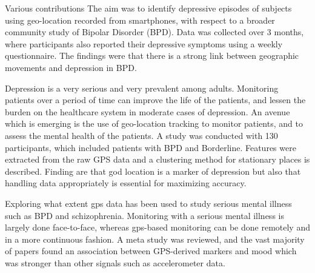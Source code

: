 Various contributions The aim was to identify depressive episodes of subjects using geo-location recorded from smartphones, with respect to a broader community study of Bipolar Disorder (BPD). Data was collected over 3 months, where participants also reported their depressive symptoms using a weekly questionnaire. The findings were that there is a strong link between geographic movements and depression in BPD. 

Depression is a very serious and very prevalent among adults. Monitoring patients over a period of time can improve the life of the patients, and lessen the burden on the healthcare system in moderate cases of depression. An avenue which is emerging is the use of geo-location tracking to monitor patients, and to assess the mental health of the patients. A study was conducted with 130 participants, which included patients with BPD and Borderline. Features were extracted from the raw GPS data and a clustering method for stationary places is described. Finding are that god location is a marker of depression but also that handling data appropriately is essential for maximizing accuracy.

Exploring what extent gps data has been used to study serious mental illness such as BPD and schizophrenia. Monitoring with a serious mental illness is largely done face-to-face, whereas gps-based monitoring can be done remotely and in a more continuous fashion. A meta study was reviewed, and the vast majority of papers found an association between GPS-derived markers and mood which was stronger than other signals such as accelerometer data. 